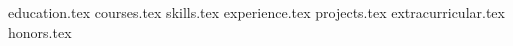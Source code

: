 \documentclass[12pt, a4paper]{awesome-cv}
\newcommand*{\sectiondir}{resume/}
\begin{document}
\makecvheader

{education.tex}
{courses.tex}
{skills.tex}
{experience.tex}
{projects.tex}
{extracurricular.tex}
{honors.tex}
\end{document}
